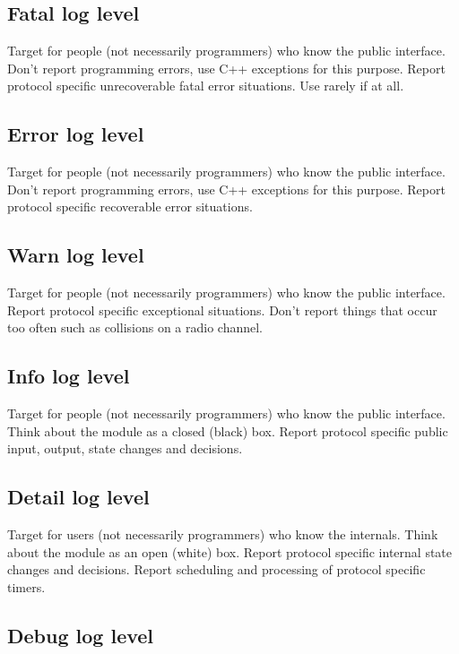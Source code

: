 \subsection*{Fatal log level}

Target for people (not necessarily programmers) who know the public interface.
Don't report programming errors, use C++ exceptions for this purpose. Report
protocol specific unrecoverable fatal error situations. Use rarely if at all.

\subsection*{Error log level}

Target for people (not necessarily programmers) who know the public interface.
Don't report programming errors, use C++ exceptions for this purpose. Report
protocol specific recoverable error situations.

\subsection*{Warn log level}

Target for people (not necessarily programmers) who know the public interface.
Report protocol specific exceptional situations. Don't report things that occur
too often such as collisions on a radio channel.

\subsection*{Info log level}

Target for people (not necessarily programmers) who know the public interface.
Think about the module as a closed (black) box. Report protocol specific public
input, output, state changes and decisions.

\subsection*{Detail log level}

Target for users (not necessarily programmers) who know the internals. Think
about the module as an open (white) box. Report protocol specific internal state
changes and decisions. Report scheduling and processing of protocol specific
timers.

\subsection*{Debug log level}

